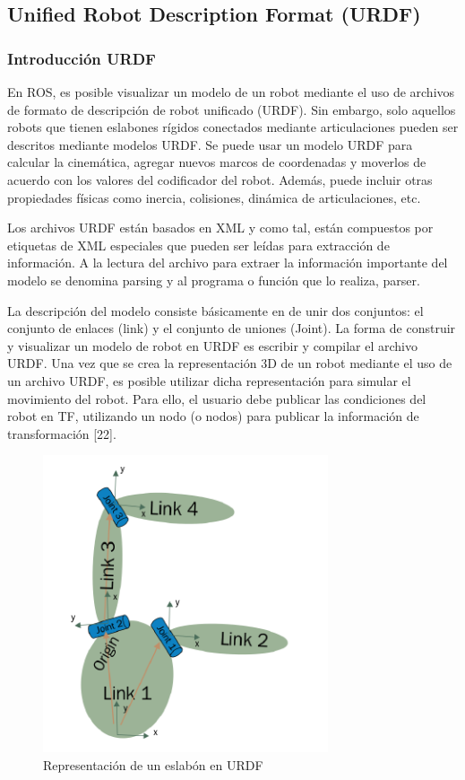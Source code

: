         
    \subsection{Unified Robot Description Format (URDF)}\label{cap2_urfdf}
    
        \subsubsection{Introducción URDF}
    
        En ROS, es posible visualizar un modelo de un robot mediante el uso de archivos de formato de descripción de robot unificado (URDF). Sin embargo, solo aquellos robots que tienen eslabones rígidos conectados mediante articulaciones pueden ser descritos mediante modelos URDF.  Se puede usar un modelo URDF para calcular la cinemática, agregar nuevos marcos de coordenadas y moverlos de acuerdo con los valores del codificador del robot. Además, puede incluir otras propiedades físicas como inercia, colisiones, dinámica de articulaciones, etc. 
        
        Los archivos URDF están basados en XML y como tal, están compuestos por etiquetas de XML especiales que pueden ser leídas para extracción de información. A la lectura del archivo para extraer la información importante del modelo se denomina parsing y al programa o función que lo realiza, parser.
        
        La descripción del modelo consiste básicamente en de unir dos conjuntos: el conjunto de enlaces (link) y el conjunto de uniones (Joint). La forma de construir y visualizar un modelo de robot en URDF es escribir y compilar el archivo URDF. Una vez que se crea la representación 3D de un robot mediante el uso de un archivo URDF, es posible utilizar dicha representación para simular el movimiento del robot. Para ello, el usuario debe publicar las condiciones del robot en TF, utilizando un nodo (o nodos) para publicar la información de transformación [22].
        
        \begin{figure}[htb]
            \centering
            \includegraphics[width=0.5\linewidth]{Main/Chapter3/Images3/3-7/representacion-de-eslabon-en-urdf.png}
            \caption{Representación de un eslabón en URDF}
            \label{f:Cap3-7_eslabon_urdf}
        \end{figure} 
        

